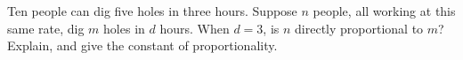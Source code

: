 Ten people can dig five holes in three hours. Suppose $n$ people, all working at this same rate, dig $m$ holes in $d$ hours. When $d=3$, is $n$ directly proportional to $m$? Explain, and give the constant of proportionality.
